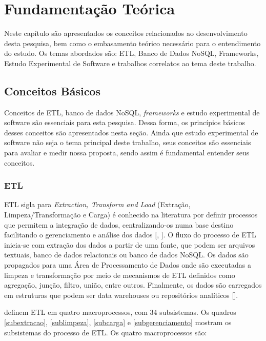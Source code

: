 \chapter{Fundamentação Teórica}

Neste capítulo são apresentados os conceitos relacionados ao desenvolvimento desta pesquisa, bem como o embasamento teórico necessário para o entendimento do estudo. Os temas abordados são: ETL, Banco de Dados NoSQL, Frameworks, Estudo Experimental de Software e trabalhos correlatos ao tema deste trabalho.


\clearpage

\section{Conceitos Básicos}

Conceitos de ETL, banco de dados NoSQL, \textit{frameworks} e estudo experimental de software são essenciais para esta pesquisa. Dessa forma, os princípios básicos desses conceitos são apresentados nesta seção. Ainda que estudo experimental de software não seja o tema principal deste trabalho, seus conceitos são essenciais para avaliar e medir nossa proposta, sendo assim é fundamental entender seus conceitos.

\subsection{ETL}

ETL sigla para \textit{Extraction, Transform and Load} (Extração, Limpeza/Transformação e Carga) é conhecido na literatura por definir processos que permitem a integração de dados, centralizando-os numa base destino facilitando o gerenciamento e análise dos dados [\cite{kimball:2004}, \cite{rud:2009}]. O fluxo do processo de ETL inicia-se com extração dos dados a partir de uma fonte, que podem ser arquivos textuais, banco de dados relacionais ou banco de dados NoSQL. Os dados são propagados para uma Área de Processamento de Dados onde são executadas a limpeza e transformação por meio de mecanismos de ETL definidos como agregação, junção, filtro, união, entre outros. Finalmente, os dados são carregados em estruturas que podem ser data warehouses ou repositórios analíticos [\cite{silva:2016}]. 

\cite{kimball:2004} definem ETL em quatro macroprocessos, com 34 subsistemas. Os quadros \ref{subextracao}, \ref{sublimpeza}, \ref{subcarga} e \ref{subgerenciamento} mostram os subsistemas do processo de ETL. Os quatro macroprocessos são:

